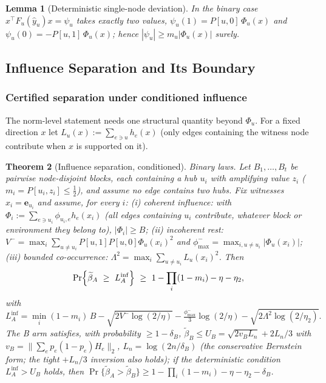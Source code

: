 \documentclass[preprint,11pt]{elsarticle}
\newtheorem{theorem}{Theorem}[section]
\newtheorem{lemma}[theorem]{Lemma}
\begin{document}
\begin{lemma}[Deterministic single-node deviation]\label{lem:dev}
In the binary case $x^\top F_u(\hat y_u)x=\psi_u$ takes exactly two
values, $\psi_u(1)=P[u,0]\,\Phi_u(x)$ and
$\psi_u(0)=-P[u,1]\,\Phi_u(x)$; hence
$|\psi_u|\ge m_u|\Phi_u(x)|$ surely.
\end{lemma}

\subsection{Influence Separation and Its Boundary}\label{sec:theory}

\subsubsection{Certified separation under conditioned influence}

The norm-level statement needs one structural quantity beyond
$\Phi_u$. For a fixed direction $x$ let
$L_u(x):=\sum_{e\ni u}h_e(x)$ (only edges containing the witness node
contribute when $x$ is supported on it).

\begin{theorem}[Influence separation, conditioned]\label{thm:sep}
Binary laws. Let $B_1,\dots,B_t$ be pairwise node-disjoint blocks, each
containing a hub $u_i$ with amplifying value $z_i$
($m_i=P[u_i,z_i]\le\tfrac12$), and assume \emph{no edge contains two
hubs}. Fix witnesses $x_i=\mathbf e_{u_i}$ and
assume, for every $i$:
(i) \emph{coherent influence}: with
$\Phi_i:=\sum_{e\ni u_i}\phi_{u_i,e}h_e(x_i)$ (all edges containing
$u_i$ contribute, whatever block or environment they belong to),
$|\Phi_i|\ge B$;
(ii) \emph{incoherent rest}:
$V^-=\max_i\sum_{u\ne u_i}P[u,1]P[u,0]\Phi_u(x_i)^2$ and
$\phi^-_{\max}=\max_{i,u\ne u_i}|\Phi_u(x_i)|$;
(iii) \emph{bounded co-occurrence}:
$\Lambda^2=\max_i\sum_{u\ne u_i}L_u(x_i)^2$. Then
\[
\Pr\Bigl\{\widetilde\beta_A\ \ge\ L_A^{\mathrm{inf}}\Bigr\}
\ \ge\ 1-\prod_i(1-m_i)-\eta-\eta_2 ,
\]
with
\[
L_A^{\mathrm{inf}}=\min_i(1-m_i)\,B
-\sqrt{2V^-\log(2/\eta)}-\tfrac{\phi^-_{\max}}3\log(2/\eta)
-\sqrt{2\Lambda^2\log(2/\eta_2)} .
\]
The B arm satisfies, with probability $\ge1-\delta_B$,
$\widetilde\beta_B\le U_B=\sqrt{2v_BL_n}+2L_n/3$ with
$v_B=\bigl\|\sum_ep_e(1-p_e)H_e\bigr\|_2$, $L_n=\log(2n/\delta_B)$
(the conservative Bernstein form; the tight ${+}L_n/3$ inversion also
holds);
if the deterministic condition
$L_A^{\mathrm{inf}}>U_B$
holds, then
$\Pr\{\widetilde\beta_A>\widetilde\beta_B\}\ge
1-\prod_i(1-m_i)-\eta-\eta_2-\delta_B$.
\end{theorem}
\end{document}
